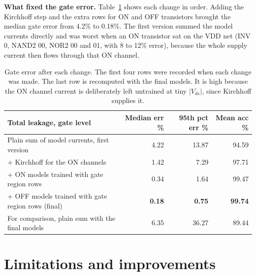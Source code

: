 \documentclass[10pt,a4paper]{article}
\newcommand{\best}[1]{\textbf{#1}}
\begin{document}
\textbf{What fixed the gate error.} Table~\ref{tab:steps} shows each change in order. Adding the Kirchhoff step and the extra rows for ON and OFF transistors brought the median gate error from 4.2\% to 0.18\%. The first version summed the model currents directly and was worst when an ON transistor sat on the VDD net (INV 0, NAND2 00, NOR2 00 and 01, with 8 to 12\% error), because the whole supply current then flows through that ON channel.

\begin{table}[H]
\centering\small
\begin{tabular}{@{}lrrr@{}}
\toprule
Total leakage, gate level & Median err \% & 95th pct err \% & Mean acc \%\\
\midrule
Plain sum of model currents, first version & 4.22 & 13.87 & 94.59\\
+ Kirchhoff for the ON channels & 1.42 & 7.29 & 97.71\\
+ ON models trained with gate region rows & 0.34 & 1.64 & 99.47\\
+ OFF models trained with gate region rows (final) & \best{0.18} & \best{0.75} & \best{99.74}\\
\midrule
For comparison, plain sum with the final models & 6.35 & 36.27 & 89.44\\
\bottomrule
\end{tabular}
\caption{Gate error after each change. The first four rows were recorded when each change was made. The last row is recomputed with the final models. It is high because the ON channel current is deliberately left untrained at tiny $|V_{ds}|$, since Kirchhoff supplies it.}\label{tab:steps}
\end{table}

\section{Limitations and improvements}
\end{document}
